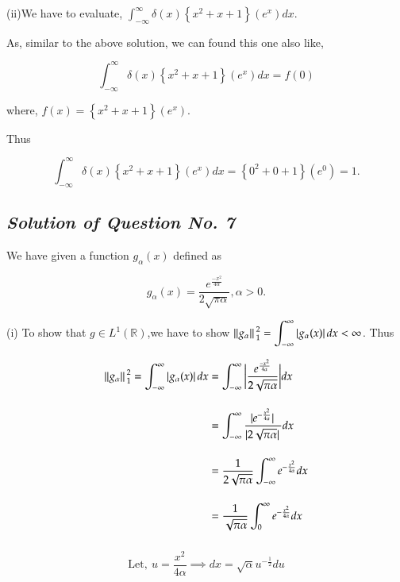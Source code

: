 \documentclass[12pt, a4paper]{article} %
\begin{document}
\vspace*{1cm}

(ii)We have to evaluate, $\displaystyle \int_{-\infty}^{\infty}\delta(x)\left\{x^2 + x + 1\right\}(e^x)dx$.

As, similar to the above solution, we can found this one also like,

\[ \int_{-\infty}^{\infty}\delta(x)\left\{x^2 + x + 1\right\}(e^x)dx = f(0)\]

where, $\displaystyle f(x) = \left\{x^2 + x + 1\right\}(e^x)$.

Thus

\[\int_{-\infty}^{\infty}\delta(x)\left\{x^2 + x + 1\right\}(e^x)dx = \left\{0^2 + 0 + 1\right\}(e^0) = 1.\]


\subsection{\slshape Solution of Question No. 7}

We have given a function $g_{\alpha}(x)$ defined as

\[g_\alpha (x) = \frac{e^{\frac{-x^2}{4\alpha}}}{2\sqrt{\pi \alpha}}, \alpha > 0. \]

(i) To show that $g\in L^1(\mathbb{R})$,we have to show $\displaystyle \norm*{g_{\alpha}}_1^2 = \int_{-\infty}^{\infty}\abs*{g_{\alpha} (x)}dx  < \infty$. Thus

\BgThispage
\begin{equation*}
    \begin{split}
        \norm*{g_{\alpha}}_1^2 = \int_{-\infty}^{\infty}\abs*{g_{\alpha} (x)}dx & = \int_{-\infty}^{\infty}\bigg|\frac{e^{\frac{-x^2}{4\alpha}}}{2\sqrt{\pi \alpha}}\bigg|dx\\[4mm]
        & = \int_{-\infty}^{\infty}\frac{\abs*{e^{-\frac{x^2}{4\alpha}}}}{\abs*{2\sqrt{\pi \alpha}}}dx\\[4mm]
        & = \frac{1}{2\sqrt{\pi \alpha}}\int_{-\infty}^{\infty}e^{-\frac{x^2}{4\alpha}}dx\\[4mm]
        & =  \frac{1}{\sqrt{\pi \alpha}}\int_{0}^{\infty}e^{-\frac{x^2}{4\alpha}}dx\\[4mm]
    \end{split}
\end{equation*}
\[\boxed{\mbox{Let},\ u = \frac{x^2}{4\alpha} \implies dx = \sqrt{\alpha}u^{-\frac{1}{2}}du}\]
\end{document}
